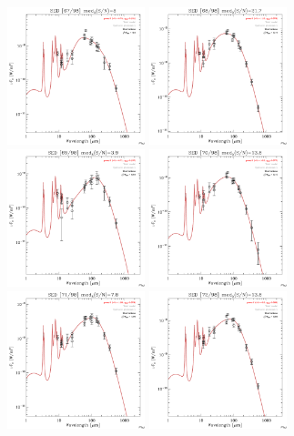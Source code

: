 \documentclass[preprint2,longabstract]{aastex}
\begin{document}
\begin{figure}
    \includegraphics[trim=0 2mm 0 0, clip, width=40mm]{../SEDs/sed_67.pdf}
	\includegraphics[trim=0 2mm 0 0, clip, width=40mm]{../SEDs/sed_68.pdf}
	\includegraphics[trim=0 2mm 0 0, clip, width=40mm]{../SEDs/sed_69.pdf}
	\includegraphics[trim=0 2mm 0 0, clip, width=40mm]{../SEDs/sed_70.pdf}
	\includegraphics[trim=0 2mm 0 0, clip, width=40mm]{../SEDs/sed_71.pdf}
	\includegraphics[trim=0 2mm 0 0, clip, width=40mm]{../SEDs/sed_72.pdf}

\end{figure}
\end{document}

